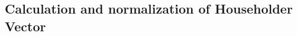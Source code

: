 \documentclass{article}
\newcommand{\R}{\mathbb{R}}
\newcommand{\bb}[1]{\mathbf{#1}}
\theoremstyle{definition}
\begin{document}
\subsection{Calculation and normalization of Householder Vector}
%
%
\end{document}
